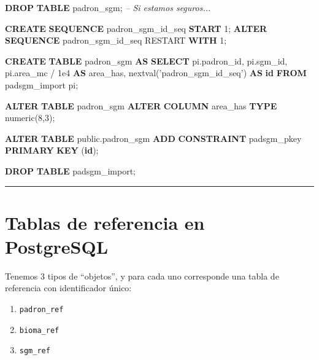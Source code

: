 \documentclass[spanish,]{article}
\newenvironment{Shaded}{}{}
\newcommand{\KeywordTok}[1]{\textcolor[rgb]{0.00,0.44,0.13}{\textbf{{#1}}}}
\newcommand{\DataTypeTok}[1]{\textcolor[rgb]{0.56,0.13,0.00}{{#1}}}
\newcommand{\DecValTok}[1]{\textcolor[rgb]{0.25,0.63,0.44}{{#1}}}
\newcommand{\FloatTok}[1]{\textcolor[rgb]{0.25,0.63,0.44}{{#1}}}
\newcommand{\StringTok}[1]{\textcolor[rgb]{0.25,0.44,0.63}{{#1}}}
\newcommand{\CommentTok}[1]{\textcolor[rgb]{0.38,0.63,0.69}{\textit{{#1}}}}
\newcommand{\NormalTok}[1]{{#1}}
\providecommand{\tightlist}{%
  \setlength{\itemsep}{0pt}\setlength{\parskip}{0pt}}
\begin{document}
\begin{Shaded}
\begin{Highlighting}[]
\KeywordTok{DROP} \KeywordTok{TABLE} \NormalTok{padron_sgm; }\CommentTok{-- Si estamos seguros...}

\KeywordTok{CREATE} \KeywordTok{SEQUENCE} \NormalTok{padron_sgm_id_seq }\KeywordTok{START} \DecValTok{1}\NormalTok{;}
\KeywordTok{ALTER}  \KeywordTok{SEQUENCE} \NormalTok{padron_sgm_id_seq RESTART }\KeywordTok{WITH} \DecValTok{1}\NormalTok{;}
    
\KeywordTok{CREATE} \KeywordTok{TABLE} \NormalTok{padron_sgm }\KeywordTok{AS}
\KeywordTok{SELECT}
  \NormalTok{pi.padron_id,}
  \NormalTok{pi.sgm_id,}
  \NormalTok{pi.area_mc / }\FloatTok{1e4} \KeywordTok{AS} \NormalTok{area_has,}
  \NormalTok{nextval(}\StringTok{'padron_sgm_id_seq'}\NormalTok{) }\KeywordTok{AS} \KeywordTok{id}
  \KeywordTok{FROM} \NormalTok{padsgm_import pi;}

\KeywordTok{ALTER} \KeywordTok{TABLE} \NormalTok{padron_sgm }\KeywordTok{ALTER} \KeywordTok{COLUMN} \NormalTok{area_has }\KeywordTok{TYPE} \DataTypeTok{numeric}\NormalTok{(}\DecValTok{8}\NormalTok{,}\DecValTok{3}\NormalTok{);}

\KeywordTok{ALTER} \KeywordTok{TABLE} \NormalTok{public.padron_sgm}
  \KeywordTok{ADD} \KeywordTok{CONSTRAINT} \NormalTok{padsgm_pkey }\KeywordTok{PRIMARY} \KeywordTok{KEY} \NormalTok{(}\KeywordTok{id}\NormalTok{);}

\KeywordTok{DROP} \KeywordTok{TABLE} \NormalTok{padsgm_import;}
\end{Highlighting}
\end{Shaded}

\begin{center}\rule{0.5\linewidth}{\linethickness}\end{center}

\section{Tablas de referencia en
PostgreSQL}\label{tablas-de-referencia-en-postgresql}

Tenemos 3 tipos de ``objetos'', y para cada uno corresponde una tabla de
referencia con identificador único:

\begin{enumerate}
\def\labelenumi{\arabic{enumi}.}
\tightlist
\item
  \texttt{padron\_ref}
\item
  \texttt{bioma\_ref}
\item
  \texttt{sgm\_ref}
\end{enumerate}
\end{document}
